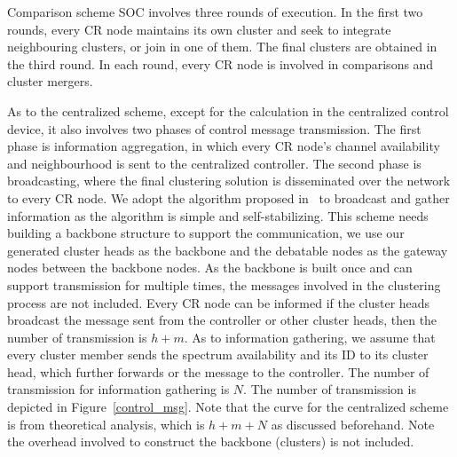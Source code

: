 \documentclass[10pt,journal,compsoc]{IEEEtran}
\theoremstyle{mytheoremstyle}
\theoremstyle{mytheoremstyle}
\theoremstyle{mytheoremstyle}
\begin{document}
Comparison scheme SOC involves three rounds of execution. 
In the first two rounds, every CR node maintains its own cluster and seek to integrate neighbouring clusters, or join in one of them.
The final clusters are obtained in the third round. 
In each round, every CR node is involved in comparisons and cluster mergers.

As to the centralized scheme, except for the calculation in the centralized control device, it also involves two phases of control message transmission.
The first phase is information aggregation, in which every CR node's channel availability and neighbourhood is sent to the centralized controller.
The second phase is broadcasting, where the final clustering solution is disseminated over the network to every CR node.
We adopt the algorithm proposed in~\cite{Efficient_broadcasting_gathering_adhoc} to broadcast and gather information as the algorithm is simple and self-stabilizing.
This scheme needs building a backbone structure to support the communication, we use our generated cluster heads as the backbone and the debatable nodes as the gateway nodes between the backbone nodes.
As the backbone is built once and can support transmission for multiple times, the messages involved in the clustering process are not included.
Every CR node can be informed if the cluster heads broadcast the message sent from the controller or other cluster heads, then the number of transmission is $h+m$.
As to information gathering, we assume that every cluster member sends the spectrum availability and its ID to its cluster head, which further forwards or the message to the controller.
The number of transmission for information gathering is $N$.
The number of transmission is depicted in Figure~\ref{control_msg}.
Note that the curve for the centralized scheme is from theoretical analysis, which is $h+m+N$ as discussed beforehand.
Note the overhead involved to construct the backbone (clusters) is not included.
\end{document}
